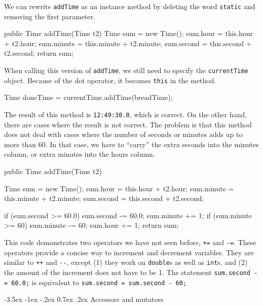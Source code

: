 \documentclass[12pt]{book}
\makeatletter
\renewcommand{\section}{\@startsection {section}{1}{\z@}%
    {-3.5ex \@plus -1ex \@minus -.2ex}%
    {0.7ex \@plus.2ex}%
    {\normalfont\Large\bfseries}}
\theoremstyle{exercise}
\newcommand{\java}[1]{\lstinline{#1}} %
\makeatother
\begin{document}
We can rewrite \java{addTime} as an instance method by deleting the word \java{static} and removing the first parameter.

\begin{code}
    public Time addTime(Time t2) {
        Time sum = new Time();
        sum.hour = this.hour + t2.hour;
        sum.minute = this.minute + t2.minute;
        sum.second = this.second + t2.second;
        return sum;
    }
\end{code}

When calling this version of \java{addTime}, we still need to specify the \java{currentTime} object.
Because of the dot operator, it becomes \java{this} in the method.

\begin{code}
    Time doneTime = currentTime.addTime(breadTime);
\end{code}

The result of this method is {\tt 12:49:30.0}, which is correct.
On the other hand, there are cases where the result is not correct.
The problem is that this method does not deal with cases where the number of seconds or minutes adds up to more than 60.
In that case, we have to ``carry'' the extra seconds into the minutes column, or extra minutes into the hours column.

\begin{code}
    public Time addTime(Time t2) {
        Time sum = new Time();
        sum.hour = this.hour + t2.hour;
        sum.minute = this.minute + t2.minute;
        sum.second = this.second + t2.second;

        if (sum.second >= 60.0) {
            sum.second -= 60.0;
            sum.minute += 1;
        }
        if (sum.minute >= 60) {
            sum.minute -= 60;
            sum.hour += 1;
        }
        return sum;
    }
\end{code}


This code demonstrates two operators we have not seen before, \java{+=} and \java{-=}.
These operators provide a concise way to increment and decrement variables.
They are similar to \java{++} and \java{--}, except (1) they work on \java{double}s as well as \java{int}s, and (2) the amount of the increment does not have to be 1.
The statement \java{sum.second -= 60.0;} is equivalent to \java{sum.second = sum.second - 60;}


\section{Accessors and mutators}
\end{document}
